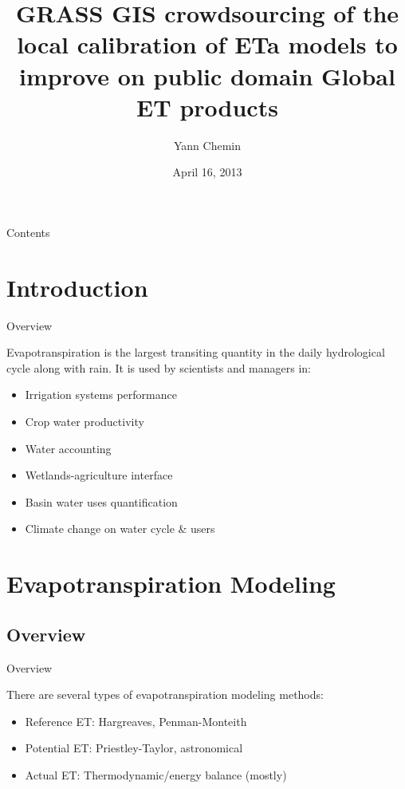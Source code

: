 \documentclass[xcolor=dvipsnames,beamer]{beamer} %
\title[crowdsourcing ET calibration]
{GRASS GIS crowdsourcing of the local calibration of ETa models to improve on public domain Global ET products}
\author[Yann Chemin]
{Yann Chemin}
\institute[IWMI]
{International Water Management Institute\\
\vspace{20pt}
}
\date{April 16, 2013}
\begin{document}
\frame{
\titlepage
}
\begin{frame}{Contents}
\tableofcontents
\end{frame}

\section{Introduction}
\begin{frame}[fragile]{Overview}

Evapotranspiration is the largest transiting quantity in the daily 
hydrological cycle along with rain. It is used by scientists and
managers in:
\newline\linebreak

\begin{itemize}
 \item Irrigation systems performance
 \item Crop water productivity
 \item Water accounting
 \item Wetlands-agriculture interface
 \item Basin water uses quantification
 \item Climate change on water cycle \& users
\end{itemize}


\end{frame}

\section{Evapotranspiration Modeling}
\subsection{Overview}
\begin{frame}[fragile]{Overview}

There are several types of evapotranspiration modeling methods:\\

\begin{itemize}
 \item Reference ET: Hargreaves, Penman-Monteith
 \item Potential ET: Priestley-Taylor, astronomical
 \item Actual ET: Thermodynamic/energy balance (mostly)
\end{itemize}

\end{frame}
\end{document}
